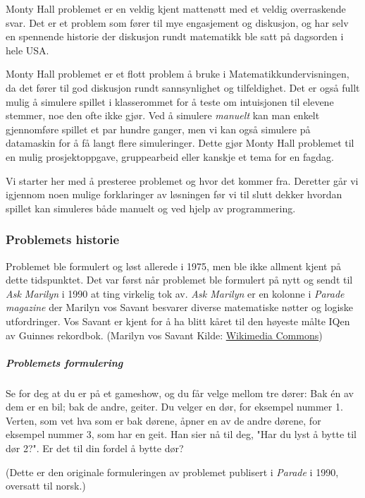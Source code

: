 \documentclass[11pt]{article}
\begin{document}
Monty Hall problemet er en veldig kjent mattenøtt med et veldig
overraskende svar. Det er et problem som fører til mye engasjement og
diskusjon, og har selv en spennende historie der diskusjon rundt
matematikk ble satt på dagsorden i hele USA.

Monty Hall problemet er et flott problem å bruke i
Matematikkundervisningen, da det fører til god diskusjon rundt
sannsynlighet og tilfeldighet. Det er også fullt mulig å simulere
spillet i klasserommet for å teste om intuisjonen til elevene stemmer,
noe den ofte ikke gjør. Ved å simulere \emph{manuelt} kan man enkelt
gjennomføre spillet et par hundre ganger, men vi kan også simulere på
datamaskin for å få langt flere simuleringer. Dette gjør Monty Hall
problemet til en mulig prosjektoppgave, gruppearbeid eller kanskje et
tema for en fagdag.

Vi starter her med å presteree problemet og hvor det kommer fra.
Deretter går vi igjennom noen mulige forklaringer av løsningen før vi
til slutt dekker hvordan spillet kan simuleres både manuelt og ved hjelp
av programmering.

\subsubsection{Problemets historie}\label{problemets-historie}

Problemet ble formulert og løst allerede i 1975, men ble ikke allment
kjent på dette tidspunktet. Det var først når problemet ble formulert på
nytt og sendt til \emph{Ask Marilyn} i 1990 at ting virkelig tok av.
\emph{Ask Marilyn} er en kolonne i \emph{Parade magazine} der Marilyn
vos Savant besvarer diverse matematiske nøtter og logiske utfordringer.
Vos Savant er kjent for å ha blitt kåret til den høyeste målte IQen av
Guinnes rekordbok. (Marilyn vos Savant Kilde:
\href{https://en.wikipedia.org/wiki/Marilyn_vos_Savant\#/media/File:Marilyn_vos_Savant.jpg}{Wikimedia
Commons})

\subparagraph{Problemets formulering}\label{problemets-formulering}

Se for deg at du er på et gameshow, og du får velge mellom tre dører:
Bak én av dem er en bil; bak de andre, geiter. Du velger en dør, for
eksempel nummer 1. Verten, som vet hva som er bak dørene, åpner en av de
andre dørene, for eksempel nummer 3, som har en geit. Han sier nå til
deg, "Har du lyst å bytte til dør 2?". Er det til din fordel å bytte
dør?

(Dette er den originale formuleringen av problemet publisert i
\emph{Parade} i 1990, oversatt til norsk.)
\end{document}
